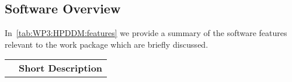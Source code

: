 \subsection{Software Overview}
\label{sec:WP3:HPDDM:summary}

In~\cref{tab:WP3:HPDDM:features} we provide a summary of the software features relevant to the work package which are briefly discussed.

\begin{table}[h!]
    \centering
    { 
        \setlength{\parindent}{0pt}
        \def\arraystretch{1.25}
        {
            \fontsize{9}{11}\selectfont
            \begin{tabular}{!{\color{numpexgray}\vrule}p{.25\linewidth}!{\color{numpexgray}\vrule}p{.6885\linewidth}!{\color{numpexgray}\vrule}}
    
     &  {\rule{0pt}{2.5ex}\color{white}\bf Short Description }\\ 
    

\end{tabular}}}
\end{table}
